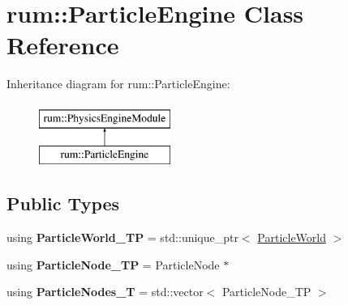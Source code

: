 \hypertarget{classrum_1_1_particle_engine}{}\section{rum\+:\+:Particle\+Engine Class Reference}
\label{classrum_1_1_particle_engine}
Inheritance diagram for rum\+:\+:Particle\+Engine\+:\begin{figure}[H]
\begin{center}
\leavevmode
\includegraphics[height=2.000000cm]{classrum_1_1_particle_engine}
\end{center}
\end{figure}
\subsection*{Public Types}
\begin{DoxyCompactItemize}
\item 
\mbox{\label{classrum_1_1_particle_engine_a3785ceb58569bfdf126f7e61cce19be5}} 
using {\bfseries Particle\+World\+\_\+\+TP} = std\+::unique\+\_\+ptr$<$ \hyperlink{classrum_1_1_particle_world}{Particle\+World} $>$
\item 
\mbox{\label{classrum_1_1_particle_engine_a49901384a4c75032ab9b5a33a5a7d5cc}} 
using {\bfseries Particle\+Node\+\_\+\+TP} = Particle\+Node $\ast$
\item 
\mbox{\label{classrum_1_1_particle_engine_aadfb6f92c3af8210a30ad71d038d8024}} 
using {\bfseries Particle\+Nodes\+\_\+T} = std\+::vector$<$ Particle\+Node\+\_\+\+TP $>$
\end{DoxyCompactItemize}
